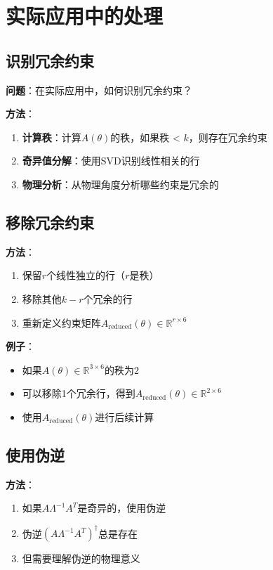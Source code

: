 \documentclass[12pt,a4paper]{article}
\begin{document}
\section{实际应用中的处理}

\subsection{识别冗余约束}

\textbf{问题}：在实际应用中，如何识别冗余约束？

\textbf{方法}：
\begin{enumerate}
\item \textbf{计算秩}：计算$A(\theta)$的秩，如果秩 < $k$，则存在冗余约束
\item \textbf{奇异值分解}：使用SVD识别线性相关的行
\item \textbf{物理分析}：从物理角度分析哪些约束是冗余的
\end{enumerate}

\subsection{移除冗余约束}

\textbf{方法}：
\begin{enumerate}
\item 保留$r$个线性独立的行（$r$是秩）
\item 移除其他$k-r$个冗余的行
\item 重新定义约束矩阵$A_{\text{reduced}}(\theta) \in \mathbb{R}^{r \times 6}$
\end{enumerate}

\textbf{例子}：
\begin{itemize}
\item 如果$A(\theta) \in \mathbb{R}^{3 \times 6}$的秩为$2$
\item 可以移除1个冗余行，得到$A_{\text{reduced}}(\theta) \in \mathbb{R}^{2 \times 6}$
\item 使用$A_{\text{reduced}}(\theta)$进行后续计算
\end{itemize}

\subsection{使用伪逆}

\textbf{方法}：
\begin{enumerate}
\item 如果$A\Lambda^{-1}A^T$是奇异的，使用伪逆
\item 伪逆$(A\Lambda^{-1}A^T)^{\dagger}$总是存在
\item 但需要理解伪逆的物理意义
\end{enumerate}
\end{document}
